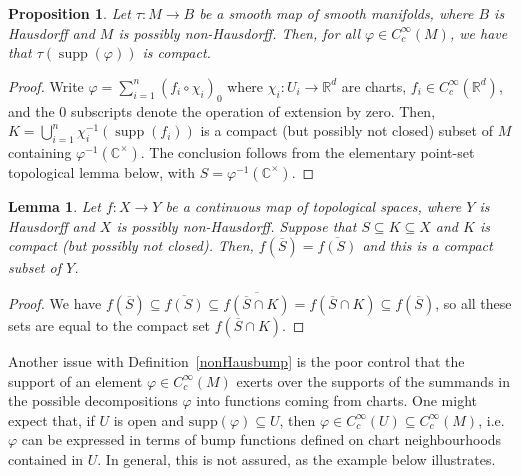 \documentclass[12pt]{article}
\theoremstyle{plain}
\newtheorem{lemma}[thm]{Lemma}
\newtheorem{propn}[thm]{Proposition}
\theoremstyle{definition}
\newcommand{\R}{\mathbb{R}}
\newcommand{\C}{\mathbb{C}}
\newcommand{\supp}{\operatorname{supp}}
\numberwithin{equation}{section}
\begin{document}
\begin{propn}\label{pointset}
Let $\tau:M \to B$ be a smooth map of smooth manifolds, where $B$ is Hausdorff and $M$ is possibly non-Hausdorff. Then, for all $\varphi \in C_c^\infty(M)$, we have that $\tau(\supp(\varphi))$ is compact.
\end{propn}
\begin{proof}
Write $\varphi = \sum_{i=1}^n (f_i \circ \chi_i)_0$ where $\chi_i : U_i \to \R^d$ are charts, $f_i \in C_c^\infty(\R^d)$, and the $0$ subscripts denote the operation of extension by zero. Then, $K = \bigcup_{i=1}^n \chi_i^{-1}(\supp(f_i))$ is a compact (but possibly not closed) subset of $M$ containing $\varphi^{-1}(\C^\times)$. The conclusion follows from the elementary point-set topological lemma below, with $S = \varphi^{-1}(\C^\times)$.
\end{proof}





\begin{lemma}
Let $f : X \to Y$ be a continuous map of topological spaces, where $Y$ is Hausdorff and $X$ is possibly non-Hausdorff. Suppose that $S \subseteq K \subseteq X$ and $K$ is compact (but possibly not closed). Then, $f(\overline S) = \overline{ f(S)}$ and this is a compact subset of $Y$. 
\end{lemma}
\begin{proof}
We have $f\left(\overline S\right) \subseteq \overline{f(S)} \subseteq \overline{f\left(\overline S \cap K\right)} = f\left(\overline S \cap K\right) \subseteq f\left(\overline S\right)$, so all these sets are equal to the compact set $f(\overline S \cap K)$.
\end{proof}





Another issue with Definition~\ref{nonHausbump} is the poor control that the support of an element $\varphi \in C_c^\infty(M)$ exerts over the supports of the summands in the possible decompositions  $\varphi$ into functions coming from charts. One might expect that, if $U$ is open and $\mathrm{supp}(\varphi) \subseteq U$, then $\varphi \in C_c^\infty(U) \subseteq C_c^\infty(M)$, i.e. $\varphi$ can be expressed in terms of bump functions defined on chart neighbourhoods contained in $U$. In general, this is not assured, as the example below illustrates.
\end{document}
